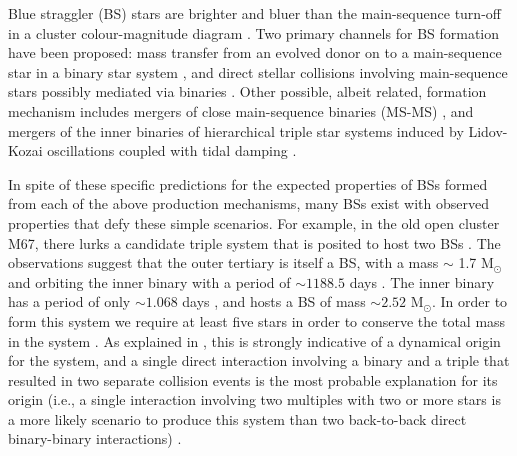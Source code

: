 \documentclass{aastex62}
\begin{document}
Blue straggler (BS) stars are brighter and bluer than the
main-sequence turn-off in a cluster colour-magnitude diagram
\citep[e.g.][]{1953AJ.....58...61S,2014ApJ...782...49S}.  Two primary
channels for BS formation have been proposed: mass transfer from an
evolved donor on to a main-sequence star in a binary star system
\citep[e.g.][]{1964MNRAS.128..147M,1997A&A...328..143P,2009Natur.457..288K,2011MNRAS.410.2370L,2011Natur.478..356G},
and direct stellar collisions involving main-sequence stars possibly
mediated via binaries
\citep[e.g.][]{1975AJ.....80..809H,1997A&A...328..130P,2007ApJ...661..210L,2013MNRAS.428..897L,2013MNRAS.429.1221H,2018arXiv181100058P}.
Other possible, albeit related, formation mechanism includes mergers
of close main-sequence binaries (MS-MS) \cite{2018arXiv181100058P},
and mergers of the inner binaries of hierarchical triple star systems
induced by Lidov-Kozai oscillations coupled with tidal damping
\citep[e.g.][]{2009ApJ...697.1048P}.

In spite of these specific predictions for the expected properties of
BSs formed from each of the above production mechanisms, many BSs
exist with observed properties that defy these simple scenarios.  For
example, in the old open cluster M67, there lurks a candidate triple
system that is posited to host two BSs
\citep{2001A&A...375..375V,2003AJ....125..810S}.  The observations
suggest that the outer tertiary is itself a BS, with a mass $\sim$ 1.7
M$_{\odot}$ and orbiting the inner binary with a period of $\sim
1188.5$ days \citep{2003AJ....125..810S}.  The inner binary has a
period of only $\sim 1.068$ days \citep{2001A&A...375..375V}, and
hosts a BS of mass $\sim 2.52$ M$_{\odot}$.  In order to form this
system we require at least five stars in order to conserve the total
mass in the system \citep{2011MNRAS.410.2370L}.  As explained in
\citet{2011MNRAS.410.2370L}, this is strongly indicative of a
dynamical origin for the system, and a single direct interaction
involving a binary and a triple that resulted in two separate
collision events is the most probable explanation for its origin
(i.e., a single interaction involving two multiples with two or more
stars is a more likely scenario to produce this system than two
back-to-back direct binary-binary interactions)
\citep{2004MNRAS.350..615G}.  
\end{document}
